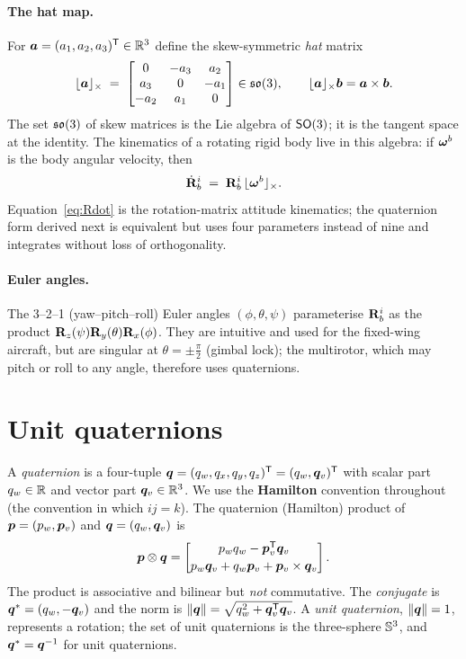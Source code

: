 \paragraph{The hat map.} For $\bm{a}=(a_1,a_2,a_3)^{\mathsf{T}}\in\mathbb{R}^3$ define the
skew-symmetric \emph{hat} matrix
\begin{equation}
\lfloor \bm{a} \rfloor_{\times} \;=\;
\begin{bmatrix} 0 & -a_3 & a_2\\ a_3 & 0 & -a_1\\ -a_2 & a_1 & 0\end{bmatrix}
\in\mathfrak{so}(3),
\qquad
\lfloor \bm{a} \rfloor_{\times}\bm{b}=\bm{a}\times\bm{b}.
\label{eq:hat}
\end{equation}
The set $\mathfrak{so}(3)$ of skew matrices is the Lie algebra of $\mathsf{SO}(3)$; it is the
tangent space at the identity. The kinematics of a rotating rigid body live in
this algebra: if $\bm{\omega}^{b}$ is the body angular velocity, then
\begin{equation}
\dot{\mathbf{R}}_b^i \;=\; \mathbf{R}_b^i\,\lfloor \bm{\omega}^{b} \rfloor_{\times}.
\label{eq:Rdot}
\end{equation}
Equation~\eqref{eq:Rdot} is the rotation-matrix attitude kinematics; the
quaternion form derived next is equivalent but uses four parameters instead of
nine and integrates without loss of orthogonality.

\paragraph{Euler angles.} The 3--2--1 (yaw--pitch--roll) Euler angles
$(\phi,\theta,\psi)$ parameterise $\mathbf{R}_b^i$ as the product
$\mathbf{R}_z(\psi)\mathbf{R}_y(\theta)\mathbf{R}_x(\phi)$. They are intuitive and used
for the fixed-wing aircraft, but are singular at $\theta=\pm\tfrac\pi2$ (gimbal
lock); the multirotor, which may pitch or roll to any angle, therefore uses
quaternions.

\section{Unit quaternions}
\label{sec:quaternions}

A \emph{quaternion} is a four-tuple $\bm{q}=(q_w,q_x,q_y,q_z)^{\mathsf{T}}
=(q_w,\bm{q}_v)^{\mathsf{T}}$ with scalar part $q_w\in\mathbb{R}$ and vector part
$\bm{q}_v\in\mathbb{R}^3$. We use the \textbf{Hamilton} convention throughout (the
convention in which $ij=k$). The quaternion (Hamilton) product of
$\bm{p}=(p_w,\bm{p}_v)$ and $\bm{q}=(q_w,\bm{q}_v)$ is
\begin{equation}
\bm{p}\otimes\bm{q}
=\begin{bmatrix} p_w q_w-\bm{p}_v^{\mathsf{T}}\bm{q}_v\\[2pt]
p_w\bm{q}_v+q_w\bm{p}_v+\bm{p}_v\times\bm{q}_v\end{bmatrix}.
\label{eq:qprod}
\end{equation}
The product is associative and bilinear but \emph{not} commutative. The
\emph{conjugate} is $\bm{q}^{\ast}=(q_w,-\bm{q}_v)$ and the norm is
$\left\lVert \bm{q} \right\rVert=\sqrt{q_w^2+\bm{q}_v^{\mathsf{T}}\bm{q}_v}$. A \emph{unit quaternion},
$\left\lVert \bm{q} \right\rVert=1$, represents a rotation; the set of unit quaternions is the
three-sphere $\mathbb{S}^3$, and $\bm{q}^{\ast}=\bm{q}^{-1}$ for unit quaternions.

